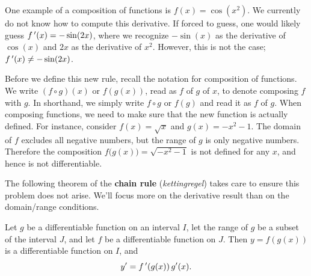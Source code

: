 One example of a composition of functions is $f(x) = \cos(x^2)$. We currently do not know how to compute this derivative. If forced to guess, one would likely guess $f\,'(x) = -\sin(2x)$, where we recognize $-\sin(x)$ as the derivative of $\cos(x)$ and $2x$ as the derivative of $x^2$. However, this is not the case; $f\,'(x)\neq -\sin(2x)$.

Before we define this new rule, recall the notation for composition of functions. We write $(f \circ g)(x)$ or $f(g(x))$, read as $f$ of $g$ of $x$, to denote composing $f$ with $g$.  In shorthand, we simply write $f \circ g$ or $f(g)$ and read it as $f$ of $g$. When composing functions, we need to make sure that the new function is actually defined. For instance, consider $f(x) = \sqrt{x}$ and $g(x) = -x^2-1$. The domain of $f$ excludes all negative numbers, but the range of $g$ is only negative numbers. Therefore the composition $f\big(g(x)\big) = \sqrt{-x^2-1}$ is not defined for any $x$, and hence is not differentiable.

The following theorem of the \textbf{chain rule} (\textit{kettingregel}) takes care to ensure this problem does not arise. We'll focus more on the derivative result than on the domain/range conditions.

\begin{theorem}\label{thm:chain_rule}
Let $g$ be a differentiable function on an interval $I$, let the range of $g$ be a subset of the interval $J$, and let $f$ be a differentiable function on $J$.
 Then $y=f(g(x))$ is a differentiable function on $I$, and 
$$y' = f\,'(g(x))\, g'(x).$$%
\end{theorem} 

\ifcourse
\ifanalysis

